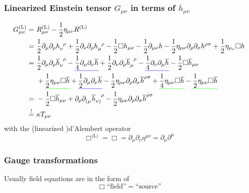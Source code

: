 \subsubsection{Linearized Einstein tensor \texorpdfstring{$G_{\mu\nu}$}{Gmunu} in terms of \texorpdfstring{$\overline{h}_{\mu\nu}$}{hbarmunu}}

\begin{equation}
    \begin{split}
        G_{\mu\nu}^{\text{(L)}} =\ & R_{\mu\nu}^{\text{(L)}} - \frac{1}{2} \eta_{\mu\nu} R^{\text{(L)}} \\
        =\ & \frac{1}{2} \partial_\mu \partial_\rho \tensor{h}{_\nu^\rho} + \frac{1}{2} \partial_\nu \partial_\rho \tensor{h}{_\mu^\rho}
        - \frac{1}{2} \Box h_{\mu\nu} - \frac{1}{2} \partial_{\mu\nu}h-\frac{1}{2} \eta_{\mu\nu}\partial_\rho\partial_\sigma h^{\rho\sigma}
        + \frac{1}{2} \eta_{\mu_\nu}\Box h \\
        =\ & \frac{1}{2} \partial_\mu\partial_\rho \tensor{\overline{h}}{_\nu^\rho} 
        - \mathunderline{blue}{\frac{1}{4}\partial_\mu\partial_\nu\overline{h}} 
        + \frac{1}{2} \partial_\nu\partial_\rho\tensor{\overline{h}}{_\mu^\rho} 
        - \mathunderline{blue}{\frac{1}{4}\partial_\nu\partial_\mu\overline{h}} - \frac{1}{2}\Box\overline{h}_{\mu\nu} \\
        & + \mathunderline{green}{\frac{1}{2}\eta_{\mu\nu}\Box\overline{h}} + \mathunderline{blue}{\frac{1}{2}\partial_\mu\partial_\nu\overline{h}}
        - \frac{1}{2}\eta_{\mu\nu}\partial_\rho\partial_\sigma\overline{h}^{\rho\sigma}
        + \mathunderline{green}{\frac{1}{4}\eta_{\mu\nu}\Box\overline{h}} - \mathunderline{green}{\frac{1}{2}\eta_{\mu\nu}\Box\overline{h}} \\
        =\ & -\frac{1}{2} \Box \overline{h}_{\mu\nu} + \partial_\rho \tensor{\partial}{_(_\mu}\tensor{\overline{h}}{_\nu_)^\rho} 
        - \frac{1}{2} \eta_{\mu\nu}\partial_\rho\partial_\sigma \overline{h}^{\rho\sigma} \\
        \overset{!}{=}\ & \kappa T_{\mu\nu}
    \end{split}
\end{equation}
with the (linearized )d'Alembert operator 
\begin{equation}
    \Box^{\text{(L)}} = \Box = \partial_\mu\partial_\nu \eta^{\mu\nu}=\partial_\mu\partial^\mu
\end{equation}

\subsubsection{Gauge transformations}
Usually field equations are in the form of
\begin{equation}
    \Box \text{``field''} = \text{``source''}
\end{equation}